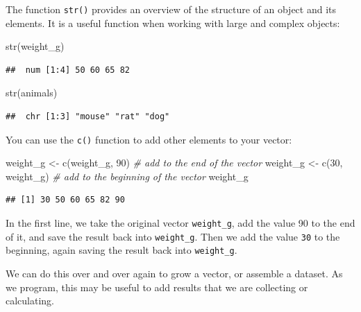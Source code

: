 \documentclass[
]{book}
\newenvironment{Shaded}{\begin{snugshade}}{\end{snugshade}}
\newcommand{\CommentTok}[1]{\textcolor[rgb]{0.56,0.35,0.01}{\textit{#1}}}
\newcommand{\DecValTok}[1]{\textcolor[rgb]{0.00,0.00,0.81}{#1}}
\newcommand{\FunctionTok}[1]{\textcolor[rgb]{0.00,0.00,0.00}{#1}}
\newcommand{\NormalTok}[1]{#1}
\newcommand{\OtherTok}[1]{\textcolor[rgb]{0.56,0.35,0.01}{#1}}
\begin{document}
The function \texttt{str()} provides an overview of the structure of an object and its elements. It is a useful function when working with large and complex objects:

\begin{Shaded}
\begin{Highlighting}[]
\FunctionTok{str}\NormalTok{(weight\_g)}
\end{Highlighting}
\end{Shaded}

\begin{verbatim}
##  num [1:4] 50 60 65 82
\end{verbatim}

\begin{Shaded}
\begin{Highlighting}[]
\FunctionTok{str}\NormalTok{(animals)}
\end{Highlighting}
\end{Shaded}

\begin{verbatim}
##  chr [1:3] "mouse" "rat" "dog"
\end{verbatim}

You can use the \texttt{c()} function to add other elements to your vector:

\begin{Shaded}
\begin{Highlighting}[]
\NormalTok{weight\_g }\OtherTok{\textless{}{-}} \FunctionTok{c}\NormalTok{(weight\_g, }\DecValTok{90}\NormalTok{) }\CommentTok{\# add to the end of the vector}
\NormalTok{weight\_g }\OtherTok{\textless{}{-}} \FunctionTok{c}\NormalTok{(}\DecValTok{30}\NormalTok{, weight\_g) }\CommentTok{\# add to the beginning of the vector}
\NormalTok{weight\_g}
\end{Highlighting}
\end{Shaded}

\begin{verbatim}
## [1] 30 50 60 65 82 90
\end{verbatim}

In the first line, we take the original vector \texttt{weight\_g}, add the value 90 to the end of it, and save the result back into \texttt{weight\_g}. Then we add the value \texttt{30} to the beginning, again saving the result back into \texttt{weight\_g}.

We can do this over and over again to grow a vector, or assemble a dataset. As we program, this may be useful to add results that we are collecting or calculating.
\end{document}
